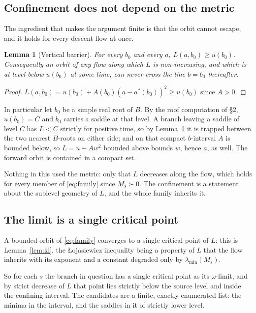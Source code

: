 \documentclass[11pt]{article}
\theoremstyle{plain}
\newtheorem{lemma}[theorem]{Lemma}
\theoremstyle{definition}
\theoremstyle{remark}
\begin{document}
\subsection*{Confinement does not depend on the metric}

The ingredient that makes the argument finite is that the orbit cannot escape,
and it holds for every descent flow at once.

\begin{lemma}[Vertical barrier]\label{lem:barrier}
For every $b_0$ and every $a$, $L(a, b_0) \geq u(b_0)$. Consequently an orbit
of any flow along which $L$ is non-increasing, and which is at level below
$u(b_0)$ at some time, can never cross the line $b = b_0$ thereafter.
\end{lemma}

\begin{proof}
$L(a,b_0) = u(b_0) + A(b_0)(a - a^*(b_0))^2 \geq u(b_0)$ since $A > 0$.
\end{proof}

In particular let $b_0$ be a simple real root of $B$. By the roof computation
of \S2, $u(b_0) = C$ and $b_0$ carries a saddle at that level. A branch
leaving a saddle of level $C$ has $L < C$ strictly for positive time, so by
Lemma~\ref{lem:barrier} it is trapped between the two nearest $B$-roots on
either side; and on that compact $b$-interval $A$ is bounded below, so
$L = u + A w^2$ bounded above bounds $w$, hence $a$, as well. The forward
orbit is contained in a compact set.

Nothing in this used the metric: only that $L$ decreases along the flow, which
holds for every member of \eqref{eq:family} since $M_s \succ 0$. The
confinement is a statement about the sublevel geometry of $L$, and the whole
family inherits it.

\subsection*{The limit is a single critical point}

A bounded orbit of \eqref{eq:family} converges to a single critical point of
$L$: this is Lemma~\ref{lem:kl}, the {\L}ojasiewicz inequality being a
property of $L$ that the flow inherits with its exponent and a constant
degraded only by $\lambda_{\min}(M_s)$.

So for each $s$ the branch in question has a single critical point as its
$\omega$-limit, and by strict decrease of $L$ that point lies strictly below
the source level and inside the confining interval. The candidates are a
finite, exactly enumerated list: the minima in the interval, and the saddles
in it of strictly lower level.
\end{document}
